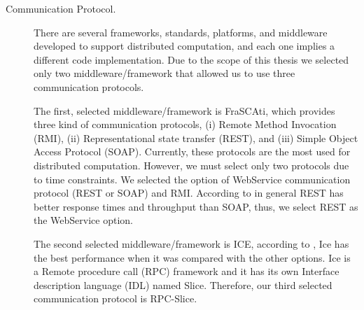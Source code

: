 \begin{description}
	\item [Communication Protocol.] There are several frameworks, standards, platforms, and middleware developed to support distributed computation, and each one implies a different code implementation. Due to the scope of this thesis we selected only two middleware/framework that allowed us to use three communication protocols. 
	
	The first, selected middleware/framework is FraSCAti, which provides three kind of communication protocols, (i) Remote Method Invocation (RMI), (ii) Representational state transfer (REST), and (iii) Simple Object Access Protocol (SOAP). Currently, these protocols are the most used for distributed computation. However, we must select only two protocols due to time constraints. We selected the option of WebService communication protocol (REST or SOAP) and RMI. According to \cite{kumari2015performance} in general REST has better response times and throughput than SOAP, thus, we select REST as the WebService option.
	
	The second selected middleware/framework is ICE, according to \cite{articleIce}, Ice has the best performance when it was compared with the other options. Ice is a Remote procedure call (RPC) framework and it has its own Interface description language (IDL) named Slice. Therefore, our third selected communication protocol is RPC-Slice.
	

\end{description}
